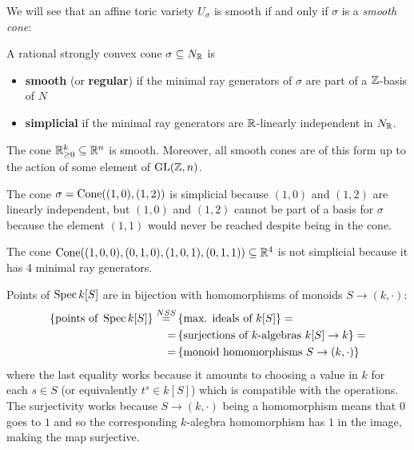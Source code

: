\noindent
We will see that an affine toric variety $U_\sigma$ is smooth if and only if $\sigma$ is a \textit{smooth cone}:

\begin{definition}[]
A rational strongly convex cone $\sigma\subseteq N_{\mathbb{R}}$ is
\begin{itemize}
\item \textbf{smooth} (or \textbf{regular}) if the minimal ray generators of $\sigma$ are part of a $\mathbb{Z}$-basis of $N$
\item \textbf{simplicial} if the minimal ray generators are $\mathbb{R}$-linearly independent in $N_{\mathbb{R}}$.
\end{itemize}
\end{definition}

\begin{example}
The cone $\mathbb{R}_{\geq0}^k\subseteq \mathbb{R}^n$ is smooth. Moreover, all smooth cones are of this form up to the action of some element of $\mathrm{GL}(\mathbb{Z},n)$.
\end{example}

\begin{example}
The cone $\sigma=\mathrm{Cone}((1,0),(1,2))$ is simplicial because $(1,0)$ and $(1,2)$ are linearly independent, but $(1,0)$ and $(1,2)$ cannot be part of a basis for $\sigma$ because the element $(1,1)$ would never be reached despite being in the cone.
\end{example}

\begin{example}
The cone $\mathrm{Cone}((1,0,0), (0,1,0), (1,0,1),(0,1,1))\subseteq \mathbb{R}^4$ is not simplicial because it has 4 minimal ray generators.
\end{example}

\begin{remark}
Points of $\operatorname{Spec} k[S]$ are in bijection with homomorphisms of monoids $S\to (k,\cdot)$:
\begin{align*}
	\left\{{\text{points of }\operatorname{Spec} k[S]}\right\}\overset{NSS}=&\left\{{\text{max. ideals of }k[S]}\right\}=\\
	=&\left\{{\text{surjections of $k$-algebras }k[S]\to k}\right\}=\\
	=&\left\{{\text{monoid homomorphisms }S\to (k,\cdot)}\right\}
\end{align*}
where the last equality works because it amounts to choosing a value in $k$ for each $s\in S$ (or equivalently $t^s\in k[S]$) which is compatible with the operations. The surjectivity works because $S\to (k,\cdot)$ being a homomorphism means that $0$ goes to $1$ and so the corresponding $k$-alegbra homomorphism has $1$ in the image, making the map surjective.
\end{remark}

